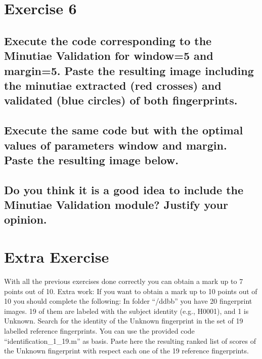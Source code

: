 \documentclass[a4paper]{article}
\begin{document}
\section{Exercise 6}

\subsection{ Execute the code corresponding to the Minutiae Validation for window=5 and margin=5.  Paste the resulting image including the minutiae extracted (red crosses) and validated (blue circles) of both fingerprints. }

















\subsection{ Execute the same code but with the optimal values of parameters window and margin. Paste the resulting image below. }


















\subsection{ Do you think it is a good idea to include the Minutiae Validation module? Justify your opinion. }




\section{Extra Exercise}
With all the previous exercises done correctly you can obtain a mark up to 7 points out of 10. 
Extra work: If you want to obtain a mark up to 10 points out of 10 you should complete the following:
In folder “/ddbb” you have 20 fingerprint images. 19 of them are labeled with the subject identity (e.g., H0001), and 1 is Unknown. Search for the identity of the Unknown fingerprint in the set of 19 labelled reference fingerprints. You can use the provided code “identification\_1\_19.m” as basis. Paste here the resulting ranked list of scores of the Unknown fingerprint with respect each one of the 19 reference fingerprints.
\end{document}

